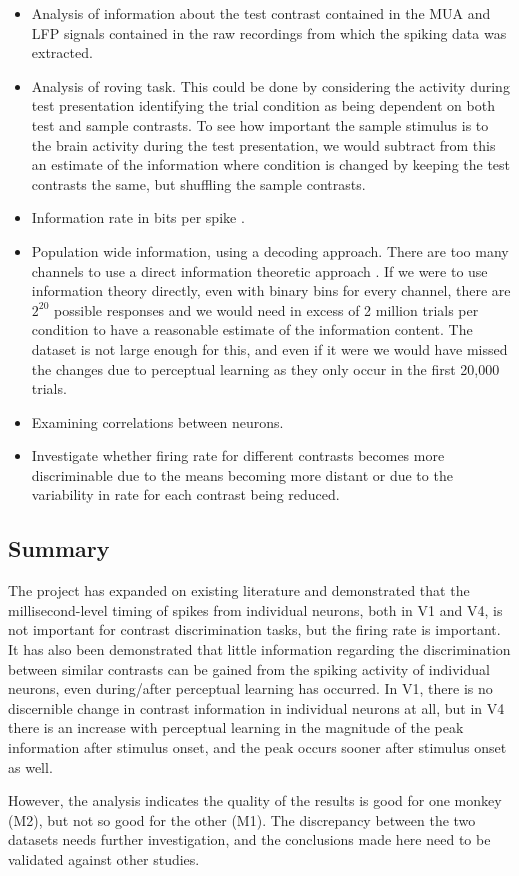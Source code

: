 \begin{itemize}
\item Analysis of information about the test contrast contained in the MUA and LFP signals contained in the raw recordings from which the spiking data was extracted.
\item Analysis of roving task. This could be done by considering the activity during test presentation identifying the trial condition as being dependent on both test and sample contrasts. To see how important the sample stimulus is to the brain activity during the test presentation, we would subtract from this an estimate of the information where condition is changed by keeping the test contrasts the same, but shuffling the sample contrasts.
\item Information rate in bits per spike \cite{Rolls2011}.
\item Population wide information, using a decoding approach. There are too many channels to use a direct information theoretic approach \cite{Quiroga2009}.
If we were to use information theory directly, even with binary bins for every channel, there are $2^20$ possible responses and we would need in excess of 2 million trials per condition to have a reasonable estimate of the information content. The dataset is not large enough for this, and even if it were we would have missed the changes due to perceptual learning as they only occur in the first 20,000 trials.
\item Examining correlations between neurons.
\item Investigate whether firing rate for different contrasts becomes more discriminable due to the means becoming more distant or due to the variability in rate for each contrast being reduced.
\end{itemize}

% 
\subsection{Summary}

The project has expanded on existing literature and demonstrated that the millisecond-level timing of spikes from individual neurons, both in V1 and V4, is not important for contrast discrimination tasks, but the firing rate is important. It has also been demonstrated that little information regarding the discrimination between similar contrasts can be gained from the spiking activity of individual neurons, even during/after perceptual learning has occurred. In V1, there is no discernible change in contrast information in individual neurons at all, but in V4 there is an increase with perceptual learning in the magnitude of the peak information after stimulus onset, and the peak occurs sooner after stimulus onset as well.

However, the analysis indicates the quality of the results is good for one monkey (M2), but not so good for the other (M1). The discrepancy between the two datasets needs further investigation, and the conclusions made here need to be validated against other studies.
